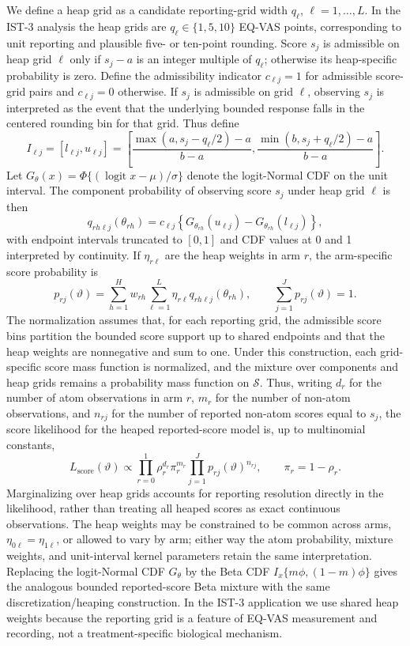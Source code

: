 \documentclass[11pt]{article}
\DeclareMathOperator*{\logit}{logit}
\begin{document}
We define a heap grid as a candidate reporting-grid width $q_\ell$, $\ell=1,\ldots,L$. In the IST-3 analysis the heap grids are $q_\ell\in\{1,5,10\}$ EQ-VAS points, corresponding to unit reporting and plausible five- or ten-point rounding. Score $s_j$ is admissible on heap grid $\ell$ only if $s_j-a$ is an integer multiple of $q_\ell$; otherwise its heap-specific probability is zero. Define the admissibility indicator $c_{\ell j}=1$ for admissible score-grid pairs and $c_{\ell j}=0$ otherwise. If $s_j$ is admissible on grid $\ell$, observing $s_j$ is interpreted as the event that the underlying bounded response falls in the centered rounding bin for that grid. Thus define
\[
  I_{\ell j}
  =
  [l_{\ell j},u_{\ell j}]
  =
  \left[
    \frac{\max(a,s_j-q_\ell/2)-a}{b-a},
    \frac{\min(b,s_j+q_\ell/2)-a}{b-a}
  \right].
\]
Let $G_\theta(x)=\Phi\{(\logit x-\mu)/\sigma\}$ denote the logit-Normal CDF on the unit interval. The component probability of observing score $s_j$ under heap grid $\ell$ is then
\[
  q_{rh\ell j}(\theta_{rh})
  =
  c_{\ell j}
  \left\{
    G_{\theta_{rh}}(u_{\ell j}) - G_{\theta_{rh}}(l_{\ell j})
  \right\},
\]
with endpoint intervals truncated to $[0,1]$ and CDF values at 0 and 1 interpreted by continuity. If $\eta_{r\ell}$ are the heap weights in arm $r$, the arm-specific score probability is
\[
  p_{rj}(\vartheta)
  =
  \sum_{h=1}^{H} w_{rh}
  \sum_{\ell=1}^{L}\eta_{r\ell} q_{rh\ell j}(\theta_{rh}),
  \qquad
  \sum_{j=1}^{J}p_{rj}(\vartheta)=1.
\]
The normalization assumes that, for each reporting grid, the admissible score bins partition the bounded score support up to shared endpoints and that the heap weights are nonnegative and sum to one. Under this construction, each grid-specific score mass function is normalized, and the mixture over components and heap grids remains a probability mass function on $\mathcal S$.
Thus, writing $d_r$ for the number of atom observations in arm $r$, $m_r$ for the number of non-atom observations, and $n_{rj}$ for the number of reported non-atom scores equal to $s_j$, the score likelihood for the heaped reported-score model is, up to multinomial constants,
\[
  L_{\mathrm{score}}(\vartheta)
  \propto
  \prod_{r=0}^{1}
  \rho_r^{d_r}\pi_r^{m_r}
  \prod_{j=1}^{J}
  p_{rj}(\vartheta)^{n_{rj}},
  \qquad
  \pi_r=1-\rho_r.
\]
Marginalizing over heap grids accounts for reporting resolution directly in the likelihood, rather than treating all heaped scores as exact continuous observations. The heap weights may be constrained to be common across arms, $\eta_{0\ell}=\eta_{1\ell}$, or allowed to vary by arm; either way the atom probability, mixture weights, and unit-interval kernel parameters retain the same interpretation. Replacing the logit-Normal CDF $G_\theta$ by the Beta CDF $I_x\{m\phi,(1-m)\phi\}$ gives the analogous bounded reported-score Beta mixture with the same discretization/heaping construction. In the IST-3 application we use shared heap weights because the reporting grid is a feature of EQ-VAS measurement and recording, not a treatment-specific biological mechanism.
\end{document}
